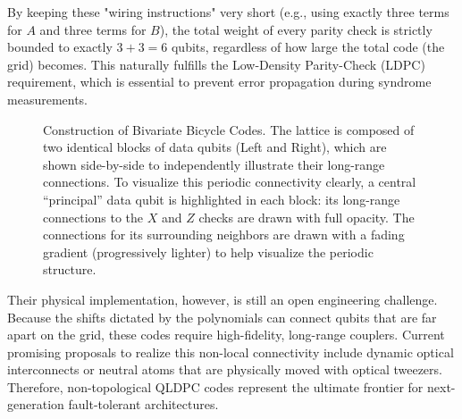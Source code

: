 By keeping these "wiring instructions" very short (e.g., using exactly three terms for $A$ and three terms for $B$), the total weight of every parity check is strictly bounded to exactly $3+3=6$ qubits, regardless of how large the total code (the grid) becomes. This naturally fulfills the Low-Density Parity-Check (LDPC) requirement, which is essential to prevent error propagation during syndrome measurements.

\begin{figure}[htpb!]
    \centering
    \resizebox{0.9\textwidth}{!}{
        
    }
    \caption[Construction of Bivariate Bicycle Codes.]{Construction of Bivariate Bicycle Codes. The lattice is composed of two identical blocks of data qubits (Left and Right), which are shown side-by-side to independently illustrate their long-range connections. To visualize this periodic connectivity clearly, a central ``principal'' data qubit is highlighted in each block: its long-range connections to the $X$ and $Z$ checks are drawn with full opacity. The connections for its surrounding neighbors are drawn with a fading gradient (progressively lighter) to help visualize the periodic structure.}
    \label{fig:2:bbc_construction}
\end{figure}

Their physical implementation, however, is still an open engineering challenge. Because the shifts dictated by the polynomials can connect qubits that are far apart on the grid, these codes require high-fidelity, long-range couplers. Current promising proposals to realize this non-local connectivity include dynamic optical interconnects or neutral atoms that are physically moved with optical tweezers. Therefore, non-topological QLDPC codes represent the ultimate frontier for next-generation fault-tolerant architectures.